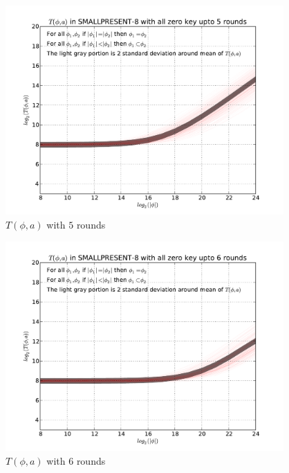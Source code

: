\documentclass[9pt]{article}
\begin{document}
\begin{figure}[h!]
    \centering
    \includegraphics[width=\textwidth , height = 8cm]{T_a_phi_variable_a_varible_phi_variable_size_05rounds}
    \caption{$T(\phi,a)$ with $5$ rounds}
    \label{fig:T_a_phi_variable_a_varible_phi_variable_size_05rounds}
\end{figure}

\begin{figure}[h!]
    \centering
    \includegraphics[width=\textwidth , height = 8cm]{T_a_phi_variable_a_varible_phi_variable_size_06rounds}
    \caption{$T(\phi,a)$ with $6$ rounds}
    \label{fig:T_a_phi_variable_a_varible_phi_variable_size_06rounds}
\end{figure}
\end{document}
